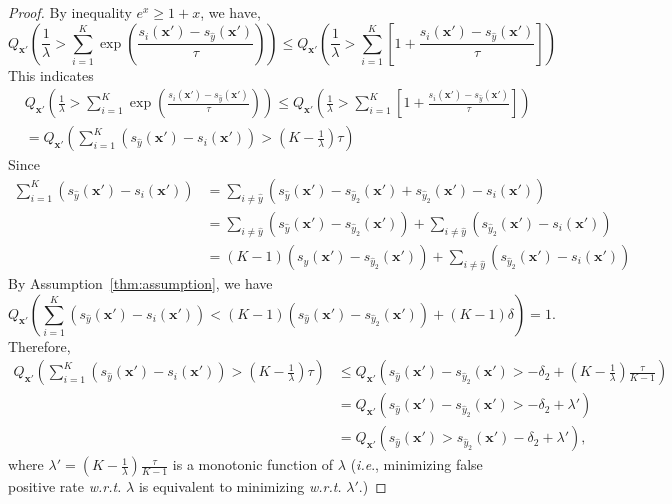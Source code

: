 \documentclass{article}
\def\*#1{\mathbf{#1}}
\def\ie{\emph{i.e}., }
\begin{document}
\begin{proof}
By inequality $e^{x} \geq 1+x$, we have,
$$
Q_{\*x'}\left(\frac{1}{\lambda}>\sum_{i=1}^{K} \exp \left(\frac{s_{i}(\*x')-s_{\hat{y}}(\*x')}{\tau}\right)\right) \leq Q_{\*x'}\left(\frac{1}{\lambda}>\sum_{i=1}^{K}\left[1+\frac{s_{i}(\*x')-s_{\hat{y}}(\*x')}{\tau}\right]\right)
$$
This indicates
$$
\begin{aligned}
& Q_{\*x'}\left(\frac{1}{\lambda}>\sum_{i=1}^{K} \exp \left(\frac{s_{i}(\*x')-s_{\hat{y}}(\*x')}{\tau}\right)\right) \leq Q_{\*x'}\left(\frac{1}{\lambda}>\sum_{i=1}^{K}\left[1+\frac{s_{i}(\*x')-s_{\hat{y}}(\*x')}{\tau}\right]\right) \\
&= Q_{\*x'}\left(\sum_{i=1}^{K}\left(s_{\hat{y}}(\*x')-s_{i}(\*x')\right)>\left(K-\frac{1}{\lambda}\right) \tau\right)
\end{aligned}
$$
Since
$$
\begin{aligned}
\sum_{i=1}^{K}\left(s_{\hat{y}}(\*x')-s_{i}(\*x')\right) &=\sum_{i \neq \hat{y}}\left(s_{\hat{y}}(\*x')-s_{\hat{y}_{2}}(\*x')+s_{\hat{y}_{2}}(\*x')-s_{i}(\*x')\right) \\
&=\sum_{i \neq \hat{y}}\left(s_{\hat{y}}(\*x')-s_{\hat{y}_{2}}(\*x')\right)+\sum_{i \neq \hat{y}}\left(s_{\hat{y}_{2}}(\*x')-s_{i}(\*x')\right) \\
&=(K-1)\left(s_{\hat{y}}(\*x')-s_{\hat{y}_{2}}(\*x')\right)+\sum_{i \neq \hat{y}}\left(s_{\hat{y}_{2}}(\*x')-s_{i}(\*x')\right)
\end{aligned}
$$
By Assumption~\ref{thm:assumption}, we have
$$
Q_{\*x'}\left(\sum_{i=1}^{K}\left(s_{\hat{y}}(\*x')-s_{i}(\*x')\right)<(K-1)\left(s_{\hat{y}}(\*x')-s_{\hat{y}_{2}}(\*x')\right)+(K-1) \delta\right)=1 .
$$
Therefore,
$$
\begin{aligned}
Q_{\*x'}\left(\sum_{i=1}^{K}\left(s_{\hat{y}}(\*x')-s_{i}(\*x')\right)>\left(K-\frac{1}{\lambda}\right) \tau\right) &\leq  Q_{\*x'}\left(s_{\hat{y}}(\*x')-s_{\hat{y}_{2}}(\*x')>-\delta_{2}+\left(K-\frac{1}{\lambda}\right) \frac{\tau}{K-1}\right) \\
& = Q_{\*x'}\left(s_{\hat{y}}(\*x')-s_{\hat{y}_{2}}(\*x')>-\delta_{2}+\lambda'\right)\\
&= Q_{\*x'}\left(s_{\hat{y}}(\*x')> s_{\hat{y}_{2}}(\*x')-\delta_{2}+\lambda'\right),
\end{aligned}
$$
where $\lambda' = \left(K-\frac{1}{\lambda}\right) \frac{\tau}{K-1}$ is a monotonic function of $\lambda$ (\ie minimizing false positive rate \emph{w.r.t.} $\lambda$ is equivalent to minimizing \emph{w.r.t.}  $\lambda'$.)


\end{proof}
\end{document}

